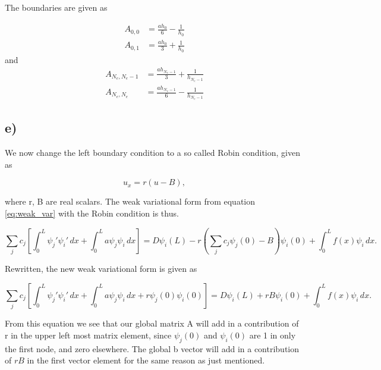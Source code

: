 \documentclass[norsk,a4paper,12pt]{scrartcl}
\begin{document}
The boundaries are given as 

\begin{equation}
\begin{aligned}
        A_{0,0} &= \frac{ah_{0}}{6} - \frac{1}{h_{0}}\\
        A_{0,1} &=  \frac{ah_{0}}{3} + \frac{1}{h_{0}} 
\end{aligned}
\end{equation}
and 
\begin{equation}
\begin{aligned}
        A_{N_e,N_e-1} &=  \frac{ah_{N_e-1}}{3} + \frac{1}{h_{N_e-1}}\\
        A_{N_e,N_e} &=  \frac{ah_{N_e-1}}{6} - \frac{1}{h_{N_e-1}} 
\end{aligned}
\end{equation}


\subsection{e)}
We now change the left boundary condition to a so called Robin condition, given as 

\begin{equation}
    u_x = r(u-B),
\end{equation}

where r, B are real scalars. The weak variational form from equation \ref{eq:weak_var} with the Robin condition is thus.

\begin{equation}\label{eq:weak_var}
   \sum_j c_j \left[ \int_0^L \psi_j'\psi_i'\,dx  + \int_0^L a\psi_j \psi_i \,dx \right]= D\psi_i(L) - r(\sum_j c_j \psi_j(0) - B)\psi_i(0)  + \int_0^L f(x) \psi_i\, dx.
\end{equation}

Rewritten, the new weak variational form is given as 

\begin{equation}\label{eq:weak_var}
   \sum_j c_j \left[ \int_0^L \psi_j'\psi_i'\,dx  + \int_0^L a\psi_j \psi_i \,dx + r\psi_j(0)\psi_i(0)\right]= D\psi_i(L) + rB\psi_i(0)  + \int_0^L f(x) \psi_i\, dx.
\end{equation}

From this equation we see that our global matrix A will add in a contribution of r in the upper left most matrix element, since $\psi_j(0)$ and $\psi_i(0)$ are 1 in only the first node, and zero elsewhere. The global b vector will add in a contribution of $rB$ in the first vector element for the same reason as just mentioned. 
\end{document}
